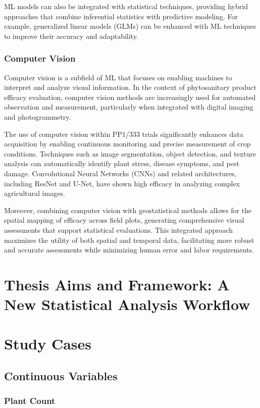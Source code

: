 \documentclass[12pt,a4paper,oneside]{report}
\begin{document}
ML models can also be integrated with statistical techniques, providing hybrid approaches that 
combine inferential statistics with predictive modeling. For example, generalized linear models 
(GLMs) can be enhanced with ML techniques to improve their accuracy and adaptability.

\subsection{Computer Vision}

Computer vision is a subfield of ML that focuses on enabling machines to interpret and analyze 
visual information. In the context of phytosanitary product efficacy evaluation, computer vision 
methods are increasingly used for automated observation and measurement, particularly when 
integrated with digital imaging and photogrammetry.

The use of computer vision within PP1/333 trials significantly enhances data acquisition by 
enabling continuous monitoring and precise measurement of crop conditions. Techniques such as 
image segmentation, object detection, and texture analysis can automatically identify plant 
stress, disease symptoms, and pest damage. Convolutional Neural Networks (CNNs) and related 
architectures, including ResNet and U-Net, have shown high efficacy in analyzing complex 
agricultural images.

Moreover, combining computer vision with geostatistical methods allows for the spatial mapping 
of efficacy across field plots, generating comprehensive visual assessments that support 
statistical evaluations. This integrated approach maximizes the utility of both spatial 
and temporal data, facilitating more robust and accurate assessments while minimizing human 
error and labor requirements.

\chapter{Thesis Aims and Framework: A New Statistical Analysis Workflow}

\chapter{Study Cases}
\section{Continuous Variables}
\subsection{Plant Count}
\end{document}
